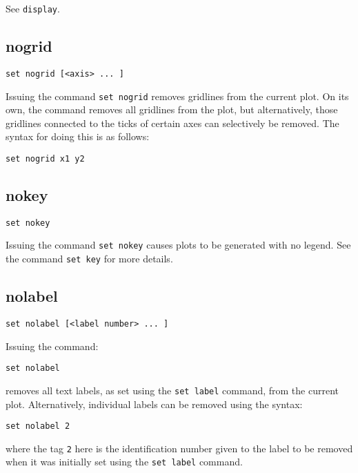 See {\tt display}.


\subsection{nogrid}

\begin{verbatim}
set nogrid [<axis> ... ]
\end{verbatim}

Issuing the command {\tt set nogrid} removes gridlines from the current plot. On
its own, the command removes all gridlines from the plot, but alternatively,
those gridlines connected to the ticks of certain axes can selectively be
removed.  The syntax for doing this is as follows:

\begin{verbatim}
set nogrid x1 y2
\end{verbatim}


\subsection{nokey}

\begin{verbatim}
set nokey
\end{verbatim}

Issuing the command {\tt set nokey} causes plots to be generated with no legend.
See the command {\tt set key} for more details.


\subsection{nolabel}

\begin{verbatim}
set nolabel [<label number> ... ]
\end{verbatim}

Issuing the command:

\begin{verbatim}
set nolabel
\end{verbatim}

\noindent removes all text labels, as set using the {\tt set label} command,
from the current plot. Alternatively, individual labels can be removed using
the syntax:

\begin{verbatim}
set nolabel 2
\end{verbatim}

\noindent where the tag {\tt 2} here is the identification number given to
the label to be removed when it was initially set using the {\tt set label}
command.


